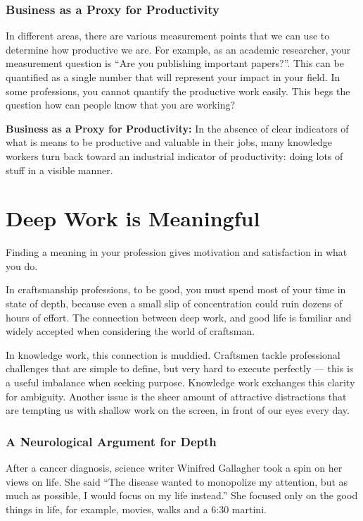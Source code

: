 \documentclass[12pt, letterpaper]{article}
\begin{document}
\subsubsection*{Business as a Proxy for Productivity}

In different areas, there are various measurement points that we can use to determine how productive we are. For example, as an academic researcher, your measurement question is ``Are you publishing important papers?''. This can be quantified as a single number that will represent your impact in your field. In some professions, you cannot quantify the productive work easily. This begs the question how can people know that you are working?

\textbf{Business as a Proxy for Productivity:} In the absence of clear indicators of what is means to be productive and valuable in their jobs, many knowledge workers turn back toward an industrial indicator of productivity: doing lots of stuff in a visible manner.

\break

\section*{Deep Work is Meaningful}

Finding a meaning in your profession gives motivation and satisfaction in what you do.

In craftsmanship professions, to be good, you must spend most of your time in state of depth, because even a small slip of concentration could ruin dozens of hours of effort. The connection between deep work, and good life is familiar and widely accepted when considering the world of craftsman.

In knowledge work, this connection is muddied. Craftsmen tackle professional challenges that are simple to define, but very hard to execute perfectly --- this is a useful imbalance when seeking purpose. Knowledge work exchanges this clarity for ambiguity. Another issue is the sheer amount of attractive distractions that are tempting us with shallow work on the screen, in front of our eyes every day.

\subsubsection*{A Neurological Argument for Depth}

After a cancer diagnosis, science writer Winifred Gallagher took a spin on her views on life. She said ``The disease wanted to monopolize my attention, but as much as possible, I would focus on my life instead.'' She focused only on the good things in life, for example, movies, walks and a 6:30 martini.
\end{document}
